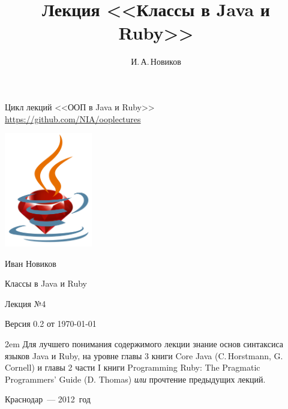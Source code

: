 \documentclass[a4paper, 14pt, titlepage]{extarticle}
\author{И.\,А.\,Новиков}
\title{Лекция <<Классы в Java и Ruby>>}
\newcommand{\eng}[1]{{\English #1}}
\newenvironment{indented}%
    { \begingroup %
        \noindent %
        \leftskip2em %
        \rightskip\leftskip }%
    { \par\endgroup }
\begin{document}

  \begin{titlepage}
  \begin{center}
    Цикл лекций <<ООП в Java и Ruby>>\\
    \url{https://github.com/NIA/ooplectures}

    \vspace{4cm}
    
    \includegraphics[height=5cm]{ruby-in-cup}

    Иван Новиков

    {\Large Классы в Java и Ruby}

    Лекция №4

    {\small Версия 0.2 от \today}

  \end{center}

    \begin{flushright}

    \end{flushright}

    \vspace{3cm}
    
    \begin{indented}
      \small Для лучшего понимания содержимого лекции знание основ синтаксиса языков Java и Ruby,
      на уровне главы 3 книги \eng{Core Java (C.\,Horstmann, G.\,Cornell)} и главы 2 части I книги
      \eng{Programming Ruby: The Pragmatic Programmers' Guide (D. Thomas)} \emph{или} прочтение
      предыдущих лекций.
    \end{indented}

    \vfill
  
  \begin{center}

    Краснодар~--- 2012~год

  \end{center}
  \end{titlepage}
\end{document}
